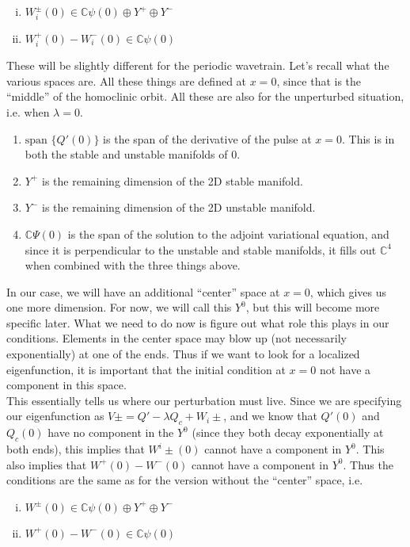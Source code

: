 \documentclass[12pt]{article}
\def\C{{\mathbb C}}
\begin{document}
\begin{enumerate}[(i)]
\item $W_i^\pm(0) \in \C \psi(0) \oplus Y^+ \oplus Y^-$
\item $W_i^+(0) - W_i^-(0) \in \C \psi(0) $
\end{enumerate}

These will be slightly different for the periodic wavetrain. Let's recall what the various spaces are. All these things are defined at $x = 0$, since that is the ``middle'' of the homoclinic orbit. All these are also for the unperturbed situation, i.e. when $\lambda = 0$.

\begin{enumerate}
	\item $\text{span }\{Q'(0)\}$ is the span of the derivative of the pulse at $x = 0$. This is in both the stable and unstable manifolds of 0.
	\item $Y^+$ is the remaining dimension of the 2D stable manifold.
	\item $Y^-$ is the remaining dimension of the 2D unstable manifold.
	\item $\C \Psi(0)$ is the span of the solution to the adjoint variational equation, and since it is perpendicular to the unstable and stable manifolds, it fills out $\C^4$ when combined with the three things above.
\end{enumerate}

In our case, we will have an additional ``center'' space at $x = 0$, which gives us one more dimension. For now, we will call this $Y^0$, but this will become more specific later. What we need to do now is figure out what role this plays in our conditions. Elements in the center space may blow up (not necessarily exponentially) at one of the ends. Thus if we want to look for a localized eigenfunction, it is important that the initial condition at $x = 0$ not have a component in this space. \\

This essentially tells us where our perturbation must live. Since we are specifying our eigenfunction as $V\pm = Q' - \lambda Q_c + W_i\pm$, and we know that $Q'(0)$ and $Q_c(0)$ have no component in the $Y^0$ (since they both decay exponentially at both ends), this implies that $W^i\pm(0)$ cannot have a component in $Y^0$. This also implies that $W^+(0) - W^-(0)$ cannot have a component in $Y^0$. Thus the conditions are the same as for the version without the ``center'' space, i.e. 

\begin{enumerate}[(i)]
\item $W^\pm(0) \in \C \psi(0) \oplus Y^+ \oplus Y^-$
\item $W^+(0) - W^-(0) \in \C \psi(0) $
\end{enumerate}
\end{document}
